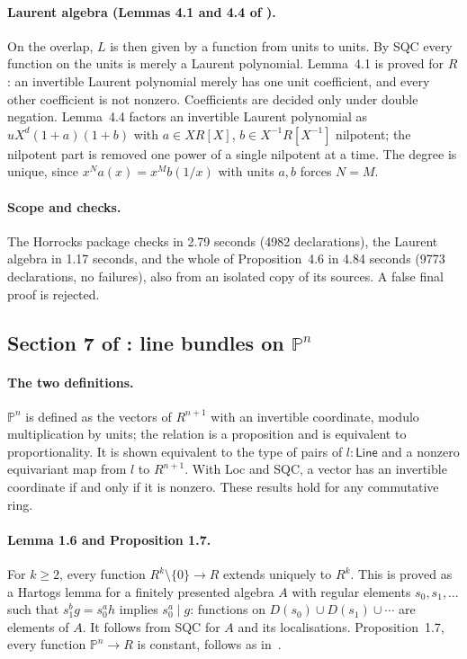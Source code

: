 \documentclass[11pt]{article}
\theoremstyle{remark}
\begin{document}
\paragraph{Laurent algebra (Lemmas 4.1 and 4.4 of \cite{Proj}).} On the
overlap, $L$ is then given by a function from units to units. By SQC
every function on the units is merely a Laurent polynomial. Lemma~4.1
is proved for $R$: an invertible Laurent polynomial merely has one unit
coefficient, and every other coefficient is not nonzero. Coefficients are
decided only under double negation. Lemma~4.4 factors an invertible Laurent polynomial as
$uX^d(1+a)(1+b)$ with $a\in XR[X]$, $b\in X^{-1}R[X^{-1}]$ nilpotent; the
nilpotent part is removed one power of a single nilpotent at a time.
The degree is unique, since $x^Na(x)=x^Mb(1/x)$ with units $a,b$ forces
$N=M$.

\paragraph{Scope and checks.} The Horrocks package checks in 2.79
seconds (4982 declarations), the Laurent algebra in 1.17 seconds, and
the whole of Proposition~4.6 in 4.84 seconds (9773 declarations, no
failures), also from an isolated copy of its sources. A false final proof
is rejected.

\subsection*{Section 7 of \cite{Proj}: line bundles on $\mathbb P^n$}

\paragraph{The two definitions.} $\mathbb P^n$ is defined as the vectors
of $R^{n+1}$ with an invertible coordinate, modulo multiplication by
units; the relation is a proposition and is equivalent to
proportionality. It is shown equivalent to the type of pairs of
$l:\mathsf{Line}$ and a nonzero equivariant map from $l$ to $R^{n+1}$.
With Loc and SQC, a vector has an invertible coordinate if and only if it
is nonzero. These results hold for any commutative ring.

\paragraph{Lemma 1.6 and Proposition 1.7.} For $k\ge2$, every function
$R^k\setminus\{0\}\to R$ extends uniquely to $R^k$. This is proved as a
Hartogs lemma for a finitely presented algebra $A$ with regular elements
$s_0,s_1,\dots$ such that $s_1^bg=s_0^ah$ implies $s_0^a\mid g$: functions
on $D(s_0)\cup D(s_1)\cup\cdots$ are elements of $A$. It follows from SQC
for $A$ and its localisations. Proposition~1.7, every function
$\mathbb P^n\to R$ is constant, follows as in~\cite{Proj}.
\end{document}
